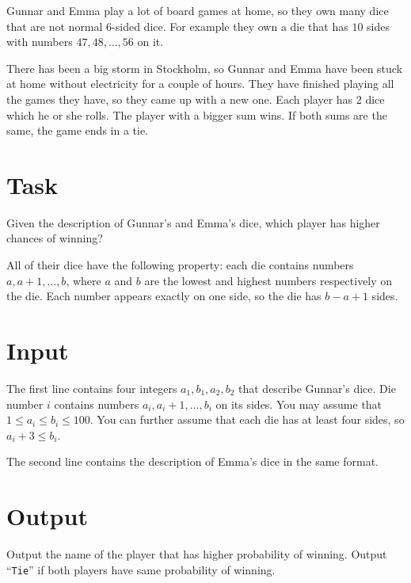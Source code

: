 

Gunnar and Emma play a lot of board games at home, so they own many dice that are not normal
$6$-sided dice. For example they own a die that has $10$ sides with numbers $47, 48, \ldots, 56$ on it.

There has been a big storm in Stockholm, so Gunnar and Emma have been stuck at home without electricity
for a couple of hours. They have finished playing all the games they have, so they came up with a new
one. Each player has 2 dice which he or she rolls. The player with a bigger sum wins. If both
sums are the same, the game ends in a tie.

\section*{Task}
Given the description of Gunnar's and Emma's dice, which player has higher chances of winning?

All of their dice have the following property: each die contains numbers $a, a+1, \dots, b$, where
$a$ and $b$ are the lowest and highest numbers respectively on the die. Each number appears exactly
on one side, so the die has $b-a+1$ sides.

\section*{Input}
The first line contains four integers $a_1, b_1, a_2, b_2$ that describe Gunnar's dice. Die number
$i$ contains numbers $a_i, a_i + 1, \dots, b_i$ on its sides. You may assume that $1\le a_i \le b_i
\le 100$. You can further assume that each die has at least four sides, so $a_i + 3\le b_i$.

The second line contains the description of Emma's dice in the same format.

\section*{Output}
Output the name of the player that has higher probability of winning. Output ``{\tt Tie}'' if both
players have same probability of winning.
